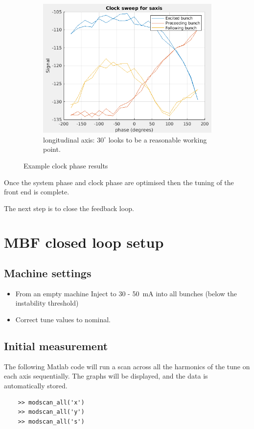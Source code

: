 \documentclass{report}
\begin{document}
\begin{figure}[hbt]
    \begin{subfigure}[b]{0.45\textwidth}
        \includegraphics[width=\textwidth]{vlr_clock_phase_scan_s.png}
        \caption{longitudinal axis: $30^\circ$ looks to be a reasonable working point.}
        \label{fig:frontend_clock_phase_scan_z}
    \end{subfigure}
    \caption{Example clock phase results}
    \label{fig:frontend_clock_phase_scan}
\end{figure}
  
Once the system phase and clock phase are optimised then the tuning of the front end is complete.

The next step is to close the feedback loop.
\clearpage
\section{MBF closed loop setup}

\subsection{Machine settings}
\begin{itemize}
    \item {From an empty machine Inject to 30 - 50~mA into all bunches (below the instability threshold)}
    \item{Correct tune values to nominal.}
\end{itemize}

\subsection{Initial measurement}
The following Matlab code will run a scan across all the harmonics of the tune on each axis sequentially. The graphs will be displayed, and the data is automatically stored.
\begin{verbatim}
    >> modscan_all('x') 
    >> modscan_all('y') 
    >> modscan_all('s') 
\end{verbatim}
\clearpage
\end{document}
